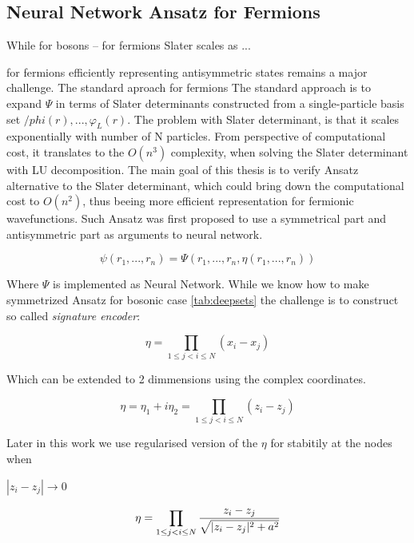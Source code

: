 \documentclass[a4paper,11pt,twoside]{article}
\begin{document}
\newpage


\subsection{Neural Network Ansatz for Fermions}
\label{sec:nn_ansatz}

While for bosons -- for fermions Slater scales as ... 

for fermions efficiently representing antisymmetric states remains a major challenge. The standard aproach for fermions The standard approach is to expand $\Psi$ in terms of Slater determinants constructed from a single-particle basis set $ /phi (r), ..., φ_L(r).$
The problem with Slater determinant, is that it scales exponentially with number of N particles. From perspective of computational cost, it translates to the $O(n^3)$ complexity, when solving the Slater determinant with LU decomposition. The main goal of this thesis is to verify Ansatz alternative to the Slater determinant, which could bring down the computational cost to $O(n^2)$, thus beeing more efficient representation for fermionic wavefunctions. Such Ansatz was first proposed to use a symmetrical part and antisymmetric part as arguments to neural network. \cite{fu_minimal_2025}

\begin{equation}
\psi(r_1 ,..., r_n) = \Psi( r_1, ...,r_n,  \eta(r_1 ,..., r_n  ))
\end{equation}


Where $\Psi$ is implemented as Neural Network. While we know how to make symmetrized Ansatz for bosonic case \ref{tab:deepsets} the challenge is to construct so called \textit{signature encoder}:

\begin{equation}
    \eta = \prod_{1 \le j < i \le N} (x_i - x_j)
\end{equation}

Which can be extended to 2 dimmensions using the complex coordinates. 

\begin{equation}
    \eta = \eta_1 + i \eta_2 = \prod_{1 \le j < i \le N} (z_i - z_j)
\end{equation}


Later in this work we use regularised version of the $\eta$ for stabitily at the nodes when

$ |z_i - z_j| \rightarrow 0 $

\begin{equation}
\title{eq:eta}
\eta = \prod_{1 \le j < i \le N} \frac{z_i - z_j}{\sqrt{|z_i - z_j|^2 + a^2}}
\end{equation}
\end{document}

